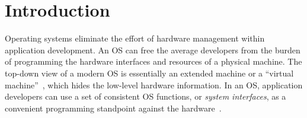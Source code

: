 \chapter{Introduction}
\label{chap:intro}


Operating systems eliminate the effort of hardware management within application development.
An OS can free the average developers from the burden of programming the hardware interfaces and resources of a physical machine.
The top-down view of a modern OS is essentially an extended machine or a ``virtual machine''~\cite{tanenbaum19os-textbook,dhamdhere2007os-textbook},
which hides the low-level hardware information.
In an OS,
application developers can use a set of consistent OS functions, 
or
{\em system interfaces},
as a convenient programming standpoint against the hardware~\cite{ritchie74unix}. 
